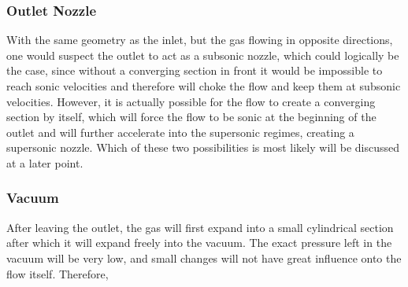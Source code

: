 \subsubsection*{Outlet Nozzle}
	
	With the same geometry as the inlet, but the gas flowing in opposite directions, one would suspect the outlet to act as a subsonic nozzle, which could logically be the case, since without a converging section in front it would be impossible to reach sonic velocities and therefore will choke the flow and keep them at subsonic velocities.
	However, it is actually possible for the flow to create a converging section by itself, which will force the flow to be sonic at the beginning of the outlet and will further accelerate into the supersonic regimes, creating a supersonic nozzle.
	Which of these two possibilities is most likely will be discussed at a later point.
	
\subsubsection*{Vacuum}

	After leaving the outlet, the gas will first expand into a small cylindrical section after which it will expand freely into the vacuum.
	The exact pressure left in the vacuum will be very low, and small changes will not have great influence onto the flow itself.
	Therefore,

\newpage


